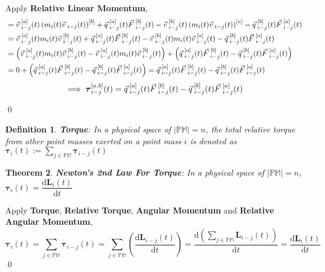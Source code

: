 \documentclass[12pt]{amsart}
\newtheorem{theorem}{Theorem}[section]
\newtheorem{definition}[theorem]{Definition}
\renewenvironment{proof}{{\bfseries Proof.}}{\qed}
\let\oldvec\vec
\renewcommand{\vec}[1]{\oldvec{#1}\hspace{0.1em}}
\begin{document}
\begin{proof}
Apply \textbf{Relative Linear Momentum},
\begin{align*}
 &= \vec{v}_{i-j} ^{[a]} (t) \left ( m_i (t)\vec{v}_{i-j} (t) \right )^{[b]} + \vec{q}^{[a]}_{i-j} (t) \vec{F}_{i-j}^{[b]} (t) - \vec{v}_{i-j} ^{[b]} (t) \left ( m_i (t)\vec{v}_{i-j} (t) \right )^{[a]} - \vec{q}^{[b]}_{i-j} (t) \vec{F}_{i-j}^{[a]} (t) \\
 &= \vec{v}_{i-j} ^{[a]} (t)  m_i (t) \vec{v}_{i-j} ^{[b]} (t) + \vec{q}^{[a]}_{i-j} (t) \vec{F}_{i-j}^{[b]} (t) - \vec{v}_{i-j} ^{[b]} (t)  m_i (t)\vec{v}_{i-j} ^{[a]} (t) - \vec{q}^{[b]}_{i-j} (t) \vec{F}_{i-j}^{[a]} (t) \\
 &= \left ( \vec{v}_{i-j} ^{[a]} (t)  m_i (t) \vec{v}_{i-j} ^{[b]} (t) - \vec{v}_{i-j} ^{[a]} (t)  m_i (t)\vec{v}_{i-j} ^{[b]} (t) \right ) + \left ( \vec{q}^{[a]}_{i-j} (t) \vec{F}_{i-j}^{[b]} (t) - \vec{q}^{[b]}_{i-j} (t) \vec{F}_{i-j}^{[a]} (t) \right )\\
 &= 0 + \left ( \vec{q}^{[a]}_{i-j} (t) \vec{F}^{[b]}_{i-j} (t) - \vec{q}^{[b]}_{i-j} (t) \vec{F}^{[a]}_{i-j} (t) \right )= \vec{q}^{[a]}_{i-j} (t) \vec{F}^{[b]}_{i-j} (t) - \vec{q}^{[b]}_{i-j} (t) \vec{F}^{[a]}_{i-j} (t)
 \end{align*}
$$\implies \boldsymbol{ \tau}_{i-j}^{[a,b]} (t) = \vec{q}^{[a]}_{i-j} (t) \vec{F}^{[b]}_{i-j} (t) - \vec{q}^{[b]}_{i-j} (t) \vec{F}^{[a]}_{i-j} (t)$$

\end{proof}

\begin{definition}
\textbf{Torque}: In a physical space of $\left | \mathbb{PM} \right | = n$, the total relative torque from other point masses exerted on a point mass $i$ is denoted as $ \boldsymbol{\tau}_{i}(t) := \displaystyle \sum_{j \in \mathbb{PM}} \boldsymbol{\tau}_{i-j} (t) $
\end{definition}

\begin{theorem}
    \textbf{Newton's 2nd Law For Torque}: In a physical space of $\left | \mathbb{PM} \right | = n$, $ \boldsymbol{\tau}_{i}(t) = \dfrac{\mathrm{d} \boldsymbol{L}_i(t) }{\mathrm{d} t} $
\end{theorem}

\begin{proof}
    
    Apply \textbf{Torque}, \textbf{Relative Torque}, \textbf{Angular Momentum} and \textbf{Relative Angular Momentum},
    $$ \boldsymbol{\tau}_{i}(t) =  \displaystyle \sum_{j \in \mathbb{PM}} \boldsymbol{\tau}_{i-j} (t) = \displaystyle \sum_{j \in \mathbb{PM}} \left (  \dfrac{\mathrm{d} \boldsymbol{L}_{i-j}(t)}{\mathrm{d} t} \right ) =  \dfrac{\mathrm{d} \left (  \displaystyle \sum_{j \in \mathbb{PM}} \boldsymbol{L}_{i-j}(t) \right ) }{\mathrm{d} t} = \dfrac{\mathrm{d} \boldsymbol{L}_i(t) }{\mathrm{d} t} $$
\end{proof}
\end{document}

